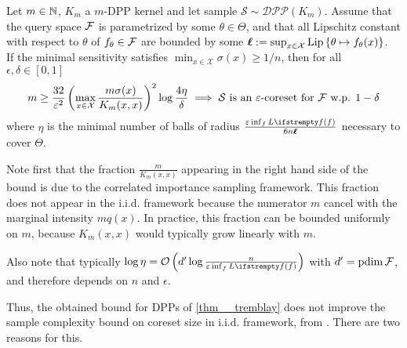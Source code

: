 \begin{tcolorbox}
	\begin{theorem}
		\label{thm__tremblay}
		Let $m \in \mathbb{N}$, $K_m$ a $m$-DPP kernel and let sample $\mathcal{S} \sim \mathcal{DPP}(K_m)$. Assume that the query space $\mathcal{F}$ is parametrized by some $\theta \in \Theta$, and that all Lipschitz constant with respect to $\theta$ of $f_\theta \in \mathcal{F}$ are bounded by some $\boldsymbol\ell := \sup_{x \in \mathcal{X}} \operatorname{Lip}\left\{\theta \mapsto f_\theta(x)\right\}$.\\

		If the minimal sensitivity satisfies $\min_{x\in \mathcal{X}}\sigma(x) \geq 1/n$, then for all $\epsilon, \delta \in [0,1]$ 
		\begin{equation*}
            m \geq \frac{32}{\varepsilon^{2}}\left(\max_{x\in \mathcal{X}}\frac{m\sigma(x)}{K_m(x,x)}\right)^2 \log \frac{4\eta}{\delta}
			\implies 
			\text{$\mathcal{S}$ is an $\varepsilon$-coreset for $\mathcal{F}$ w.p. $1-\delta$}
		\end{equation*}
		where $\eta$ is the minimal number of balls of radius $\frac{\epsilon \inf_{f}\loss{f}}{6 n \lipschitz}$ necessary to cover $\Theta$.
	\end{theorem}
\end{tcolorbox}
Note first that the fraction $\frac{m}{K_m(x,x)}$ appearing in the right hand side of the bound is due to the correlated importance sampling framework. This fraction does not appear in the i.i.d. framework because the numerator $m$ cancel with the marginal intensity $mq(x)$. In practice, this fraction can be bounded uniformly on $m$, because $K_m(x,x)$ would typically grow linearly with $m$.

Also note that typically $\log \eta = \OO\left(\pdim \log \frac{n}{\epsilon \inf_{f}\loss{f}}\right)$ with ${d'} = \operatorname{pdim}\mathcal{F}$, and therefore depends on $n$ and $\epsilon$.


Thus, the obtained bound for DPPs of \cref{thm__tremblay} does not improve the sample complexity bound on coreset size in i.i.d. framework, from \cite{braverman2016coresetsota}. There are two reasons for this. 

